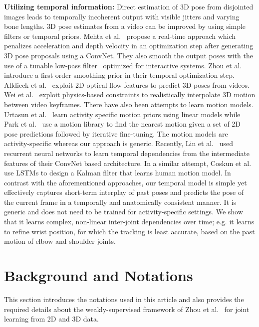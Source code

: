 \documentclass[runningheads]{llncs}
\begin{document}
\textbf{Utilizing temporal information:} Direct estimation of 3D pose from disjointed images leads to temporally incoherent output with visible jitters and varying bone lengths. 3D pose estimates from a video can be improved by using simple filters or temporal priors. Mehta et al.~\cite{VNect_SIGGRAPH2017} propose a real-time approach which penalizes acceleration and depth velocity in an optimization step after generating 3D pose proposals using a ConvNet. They also smooth the output poses with the use of a tunable low-pass filter~\cite{casiez20121} optimized for interactive systems. Zhou et al.~\cite{zhou2016sparseness} introduce a first order smoothing prior in their temporal optimization step. Alldieck et al.~\cite{Alldieck2017} exploit 2D optical flow features to predict 3D poses from videos. Wei et al.~\cite{Wei:2010} exploit physics-based constraints to realistically interpolate 3D motion between video keyframes. There have also been attempts to learn motion models. Urtasun et al.~\cite{urtasun2006temporal} learn activity specific motion priors using linear models while Park et al.~\cite{Park:2006} use a motion library to find the nearest motion given a set of 2D pose predictions followed by iterative fine-tuning. The motion models are activity-specific whereas our approach is generic. Recently, Lin et al.~\cite{Lin_2017_CVPR} used recurrent neural networks to learn temporal dependencies from the intermediate features of their ConvNet based architecture. In a similar attempt, Coskun et al.~\cite{Coskun_2017_ICCV} use LSTMs to design a Kalman filter that learns human motion model. In contrast with the aforementioned approaches, our temporal model is simple yet effectively captures short-term interplay of past poses and predicts the pose of the current frame in a temporally and anatomically consistent manner. It is generic and does not need to be trained for activity-specific settings. We show that it learns complex, non-linear inter-joint dependencies over time; e.g. it learns to refine wrist position, for which the tracking is least accurate, based on the past motion of elbow and shoulder joints.

\section{Background and Notations} \label{sec:background}
This section introduces the notations used in this article and also provides the required details about the weakly-supervised framework of Zhou et al.~\cite{Zhou_2017_ICCV} for joint learning from 2D and 3D data. 
\end{document}
